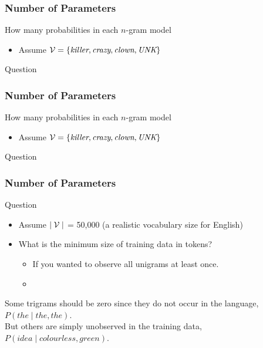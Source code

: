 \begin{frame}
\frametitle{Number of Parameters}
\begin{block}{How many probabilities in each $n$-gram model}
\begin{itemize}
\item Assume ${\cal V} = \{ \textit{killer}, \textit{crazy}, \textit{clown}, \textit{UNK} \}$
\end{itemize}
\end{block}
\pause
\begin{alertblock}{Question}
\end{alertblock}
\end{frame}

\begin{frame}
\frametitle{Number of Parameters}
\begin{block}{How many probabilities in each $n$-gram model}
\begin{itemize}
\item Assume ${\cal V} = \{ \textit{killer}, \textit{crazy}, \textit{clown}, \textit{UNK} \}$
\end{itemize}
\end{block}
\pause
\begin{alertblock}{Question}
\end{alertblock}
\end{frame}

\begin{frame}
\frametitle{Number of Parameters}
\begin{alertblock}{Question}
\begin{itemize}
\item Assume $\mid {\cal V} \mid$ = 50,000 (a realistic vocabulary size for English)
\item What is the minimum size of training data in tokens?
\begin{itemize}
\item If you wanted to observe all unigrams at least once.
\item {}
\end{itemize}
\end{itemize}
\end{alertblock}
\bigskip
\begin{block}{}
Some trigrams should be zero since they do not occur in the language, $P(the \mid the, the)$. \\
But others are simply unobserved in the training data, $P(idea \mid colourless, green)$.
\end{block}
\end{frame}

